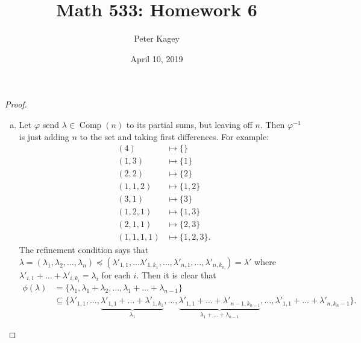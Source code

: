 \documentclass{article}
\newenvironment{problem}[2][Problem]{\begin{trivlist}
\item[\hskip \labelsep {\bfseries #1}\hskip \labelsep {\bfseries #2.}]}{\end{trivlist}}
\newcommand{\set}[1]{\{ #1 \}}
\newcommand{\inv}[1]{#1^{-1}}
\begin{document}
\title{Math 533: Homework 6}
\author{Peter Kagey}
\date{April 10, 2019}

\maketitle

\begin{problem}{1}
\end{problem}

\begin{proof} ~
  \begin{enumerate}[(a)]
    \item Let $\varphi$ send $\lambda \in \operatorname{Comp}(n)$ to its partial
    sums, but leaving off $n$. Then $\inv\varphi$ is just adding $n$ to the set and
    taking first differences. For example: \begin{align*}
      (4)          &\mapsto \set{}      \\
      (1, 3)       &\mapsto \set{1}     \\
      (2, 2)       &\mapsto \set{2}     \\
      (1, 1, 2)    &\mapsto \set{1,2}   \\
      (3, 1)       &\mapsto \set{3}     \\
      (1, 2, 1)    &\mapsto \set{1,3}   \\
      (2, 1, 1)    &\mapsto \set{2,3}   \\
      (1, 1, 1, 1) &\mapsto \set{1,2,3}.
    \end{align*}
    The refinement condition says that $\lambda = (\lambda_1, \lambda_2, \hdots, \lambda_n) \preceq (\lambda'_{1,1}, \hdots \lambda'_{1,k_1},\hdots, \lambda'_{n,1}, \hdots, \lambda'_{n,k_n}) = \lambda'$
    where $\lambda'_{i,1} + \hdots + \lambda'_{i,k_i} = \lambda_i$ for each $i$.
    Then it is clear that
    \begin{align*}
      \phi(\lambda)
        &= \set{\lambda_1, \lambda_1 + \lambda_2, \hdots, \lambda_1 + \hdots + \lambda_{n-1}} \\
        &\subseteq \set{
          \lambda'_{1,1},
          \hdots,
          \underbrace{\lambda'_{1,1} + \hdots + \lambda'_{1,k_1}}_{\lambda_1},
          \hdots,
          \underbrace{\lambda'_{1,1} + \hdots + \lambda'_{n-1,k_{n-1}}}_{\lambda_1 + \hdots + \lambda_{n-1}},
          \hdots,
          \lambda'_{1,1} + \hdots + \lambda'_{n,k_n-1}
        }.
    \end{align*}

\end{enumerate}
\end{proof}
\end{document}

